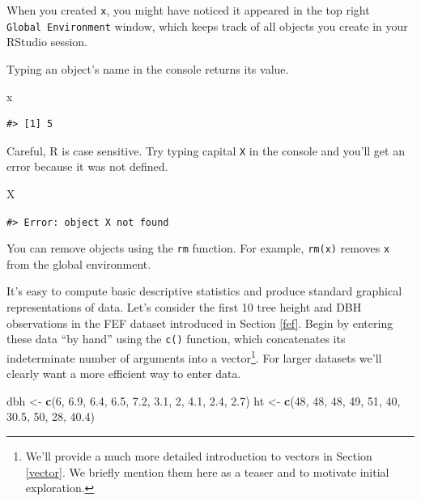 \documentclass[
  11pt,
]{krantz}
\newenvironment{Shaded}{\begin{snugshade}}{\end{snugshade}}
\newcommand{\DecValTok}[1]{\textcolor[rgb]{0.00,0.00,0.81}{#1}}
\newcommand{\FloatTok}[1]{\textcolor[rgb]{0.00,0.00,0.81}{#1}}
\newcommand{\KeywordTok}[1]{\textcolor[rgb]{0.13,0.29,0.53}{\textbf{#1}}}
\newcommand{\NormalTok}[1]{#1}
\newcommand{\StringTok}[1]{\textcolor[rgb]{0.31,0.60,0.02}{#1}}
\theoremstyle{definition}
\theoremstyle{definition}
\theoremstyle{definition}
\theoremstyle{definition}
\theoremstyle{remark}
\begin{document}
When you created \texttt{x}, you might have noticed it appeared in the top right \texttt{Global\ Environment} window, which keeps track of all objects you create in your RStudio session.

Typing an object's name in the console returns its value.

\begin{Shaded}
\begin{Highlighting}[]
\NormalTok{x}
\end{Highlighting}
\end{Shaded}

\begin{verbatim}
#> [1] 5
\end{verbatim}

Careful, R is case sensitive. Try typing capital \texttt{X} in the console and you'll get an error because it was not defined.

\begin{Shaded}
\begin{Highlighting}[]
\NormalTok{X}
\end{Highlighting}
\end{Shaded}

\texttt{\#\textgreater{}\ Error:\ object\ \textquotesingle{}X\textquotesingle{}\ not\ found}

You can remove objects using the \texttt{rm} function. For example, \texttt{rm(x)} removes \texttt{x} from the global environment.

It's easy to compute basic descriptive statistics and produce standard graphical representations of data. Let's consider the first 10 tree height and DBH observations in the FEF dataset introduced in Section \ref{fef}. Begin by entering these data ``by hand'' using the \texttt{c()} function, which concatenates its indeterminate number of arguments into a vector\footnote{We'll provide a much more detailed introduction to vectors in Section \ref{vector}. We briefly mention them here as a teaser and to motivate initial exploration.}. For larger datasets we'll clearly want a more efficient way to enter data.

\begin{Shaded}
\begin{Highlighting}[]
\NormalTok{dbh \textless{}{-}}\StringTok{ }\KeywordTok{c}\NormalTok{(}\DecValTok{6}\NormalTok{, }\FloatTok{6.9}\NormalTok{, }\FloatTok{6.4}\NormalTok{, }\FloatTok{6.5}\NormalTok{, }\FloatTok{7.2}\NormalTok{, }\FloatTok{3.1}\NormalTok{, }\DecValTok{2}\NormalTok{, }\FloatTok{4.1}\NormalTok{, }\FloatTok{2.4}\NormalTok{, }\FloatTok{2.7}\NormalTok{)}
\NormalTok{ht \textless{}{-}}\StringTok{ }\KeywordTok{c}\NormalTok{(}\DecValTok{48}\NormalTok{, }\DecValTok{48}\NormalTok{, }\DecValTok{48}\NormalTok{, }\DecValTok{49}\NormalTok{, }\DecValTok{51}\NormalTok{, }\DecValTok{40}\NormalTok{, }\FloatTok{30.5}\NormalTok{, }\DecValTok{50}\NormalTok{, }\DecValTok{28}\NormalTok{, }\FloatTok{40.4}\NormalTok{)}
\end{Highlighting}
\end{Shaded}
\end{document}
